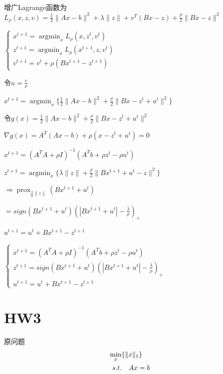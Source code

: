 \documentclass{xjtureport}
\begin{document}
增广Lagrange函数为$L_{\rho}(x,z,v) = \frac{1}{2} \|Ax - b \| ^2 + \lambda \|z\| + v^T(Bx-z) + \frac{\rho}{2} \|Bx-z\|^2$

$\left\{\begin{matrix}
    x^{t+1} =\mathop{argmin}_{x}L_\rho (x,z^t,v^t)\\ 
    z^{t+1} =\mathop{argmin}_{x}L_\rho (x^{t+1},z,v^{t})\\ 
    v^{t+1} = v^t + \rho(Bx^{t+1} -z^{t+1}) 
   \end{matrix}\right.$

令$u = \frac{v}{\rho}$

$x^{t+1} = \mathop{argmin}_{x} \{\frac{1}{2} \| Ax - b\|^2 + \frac{\rho}{2} \| Bx - z^t +u^t\|^2\}$

令$g(x) = \frac{1}{2} \| Ax - b\|^2 + \frac{\rho}{2} \| Bx - z^t +u^t\|^2$

$\nabla g(x) = A^T(Ax -b) + \rho(x-z^t+u^t) = 0$

$x^{t+1} = (A^TA+\rho I)^{-1}(A^Tb + \rho z^t - \rho u^t)$

$z^{t+1} = \mathop{argmin}_{x} \{\lambda \|z\| + \frac{\rho}{2} \|Bx^{t+1} + u^t - z\|^2\}$

$\Rightarrow \mathop{prox}_{\frac{\lambda}{\rho} \|z\|}(Bx^{t+1} + u^t)$

$=sign(Bx^{t+1} + u^t)(|Bx^{t+1} + u^t| - \frac{\lambda }{\rho})_+$

$u^{t+1} = u^t + Bx^{t+1} -z^{t+1}$

$\left\{\begin{matrix}
    x^{t+1} =(A^TA+\rho I)^{-1}(A^Tb + \rho z^t - \rho u^t)\\ 
    z^{t+1} =sign(Bx^{t+1} + u^t)(|Bx^{t+1} + u^t| - \frac{\lambda }{\rho})_+\\ 
    u^{t+1} = u^t + Bx^{t+1} -z^{t+1} 
   \end{matrix}\right.$
\section{HW3}
原问题
\begin{equation}
    \begin{aligned} \label{P}
        & \mathop{\min}_{x}\{ \|x\|_1\}\\
        &\begin{array}[]{r@{\quad}r@{}l@{\quad}l}
        s.t.& Ax = b\\
        \end{array}
    \end{aligned}
\end{equation}
\end{document}
